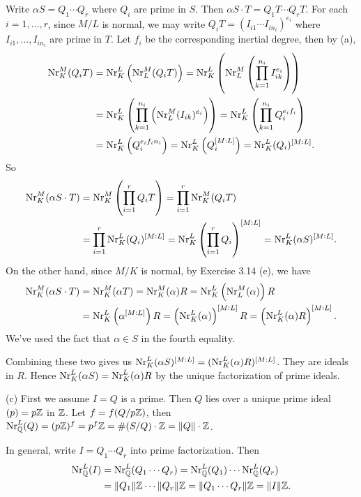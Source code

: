 \documentclass[../Marcus.tex]{subfiles}
\begin{document}
Write $\alpha S=Q_1\cdots Q_r$ where $Q_i$ are prime in $S$. Then $\alpha S\cdot T=Q_1T\cdots Q_rT$. For each $i=1,\ldots,r$, since $M/L$ is normal, we may write $Q_iT=(I_{i1}\cdots I_{in_i})^{e_i}$ where $I_{i1},\ldots,I_{in_i}$ are prime in $T$. Let $f_i$ be the corresponding inertial degree, then by (a),
\begin{align*}
    \operatorname{Nr}^M_K(Q_iT)
	&= \operatorname{Nr}^L_K\left(\operatorname{Nr}^M_L(Q_iT)\right)
	= \operatorname{Nr}^L_K\left(\operatorname{Nr}^M_L\left(\prod_{k=1}^{n_i} I_{ik}^{e_i}\right)\right)    \\
    &= \operatorname{Nr}^L_K\left(\prod_{k=1}^{n_i}\left(\operatorname{Nr}^M_L (I_{ik})^{e_i}\right)\right)
	= \operatorname{Nr}^L_K\left(\prod_{k=1}^{n_i} Q_i^{e_if_i}\right)     \\
    &= \operatorname{Nr}^L_K\left(Q_i^{e_if_in_i}\right)
	= \operatorname{Nr}^L_K\left(Q_i^{[M:L]}\right)
	= \operatorname{Nr}^L_K(Q_i)^{[M:L]}.
\end{align*}
So
\begin{align*}
    \operatorname{Nr}^M_K(\alpha S\cdot T)
	&= \operatorname{Nr}^M_K\left(\prod_{i=1}^r Q_iT\right)
	= \prod_{i=1}^r \operatorname{Nr}^M_K(Q_iT)    \\
	&= \prod_{i=1}^r \operatorname{Nr}^L_K(Q_i)^{[M:L]}
    = \operatorname{Nr}^L_K\left(\prod_{i=1}^r Q_i\right)^{[M:L]}
	= \operatorname{Nr}^L_K(\alpha S)^{[M:L]}.
\end{align*}
On the other hand, since $M/K$ is normal, by Exercise 3.14 (e), we have
\begin{align*}
    \operatorname{Nr}^M_K(\alpha S\cdot T)
	&= \operatorname{Nr}^M_K(\alpha T)
	= \operatorname{Nr}^M_K(\alpha)R
	= \operatorname{Nr}^L_K\left(\operatorname{Nr}^M_L(\alpha)\right)R     \\
    &= \operatorname{Nr}^L_K\left(\alpha^{[M:L]}\right)R
	= \left(\operatorname{Nr}^L_K(\alpha)\right)^{[M:L]}R
	= \left(\operatorname{Nr}^L_K(\alpha)R\right)^{[M:L]}. 
\end{align*}
We've used the fact that $\alpha\in S$ in the fourth equality.

Combining these two gives us $\operatorname{Nr}^L_K(\alpha S)^{[M:L]}=(\operatorname{Nr}^L_K(\alpha)R)^{[M:L]}$. They are ideals in $R$. Hence $\operatorname{Nr}^L_K(\alpha S)=\operatorname{Nr}^L_K(\alpha)R$ by the unique factorization of prime ideals.

(c) First we assume $I=Q$ is a prime. Then $Q$ lies over a unique prime ideal $(p)=p\mathbb{Z}$ in $\mathbb{Z}$. Let $f=f(Q/p\mathbb{Z})$, then $\operatorname{Nr}^L_{\mathbb{Q}}(Q)=(p\mathbb{Z})^f=p^f\mathbb{Z}=\#(S/Q)\cdot\mathbb{Z}=\|Q\|\cdot\mathbb{Z}$.

In general, write $I=Q_1\cdots Q_r$ into prime factorization. Then
\begin{align*}
	\operatorname{Nr}^L_{\mathbb{Q}}(I)
	&= \operatorname{Nr}^L_{\mathbb{Q}}(Q_1\cdots Q_r)
	= \operatorname{Nr}^L_{\mathbb{Q}}(Q_1)\cdots\operatorname{Nr}^L_{\mathbb{Q}}(Q_r)    \\
	&= \|Q_1\|\mathbb{Z}\cdots\|Q_r\|\mathbb{Z}
	= \|Q_1\cdots Q_r\|\mathbb{Z}
	= \|I\|\mathbb{Z}.
\end{align*}
\end{document}
